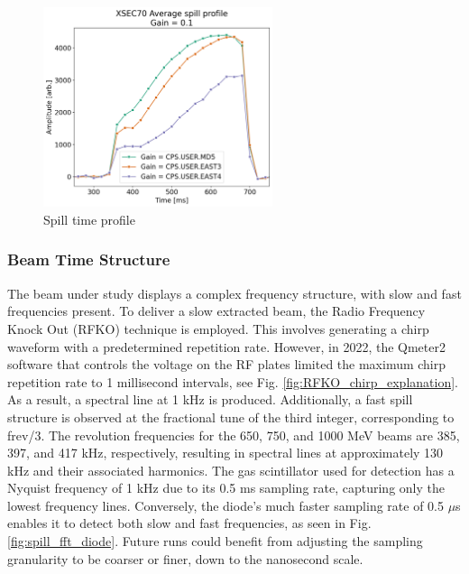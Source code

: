 \begin{figure}[!htb]
\centering
\includegraphics[width=0.6\textwidth]{images/spill_profile_xsec70_average_gain_0.1.png}
\caption{Spill time profile}
\label{fig:spill_time_profile4}
\end{figure}

\subsubsection{Beam Time Structure}
\label{beam_time_structure}

The beam under study displays a complex frequency structure, with slow and fast frequencies present. To deliver a slow extracted beam, the Radio Frequency Knock Out (RFKO) technique is employed. This involves generating a chirp waveform with a predetermined repetition rate. However, in 2022, the Qmeter2 software that controls the voltage on the RF plates limited the maximum chirp repetition rate to 1 millisecond intervals, see Fig. \ref{fig:RFKO_chirp_explanation}. As a result, a spectral line at 1 kHz is produced. Additionally, a fast spill structure is observed at the fractional tune of the third integer, corresponding to frev/3. The revolution frequencies for the 650, 750, and 1000 MeV beams are 385, 397, and 417 kHz, respectively, resulting in spectral lines at approximately 130 kHz and their associated harmonics. The gas scintillator used for detection has a Nyquist frequency of 1 kHz due to its 0.5 ms sampling rate, capturing only the lowest frequency lines. Conversely, the diode's much faster sampling rate of 0.5 $\mu$s enables it to detect both slow and fast frequencies, as seen in Fig. \ref{fig:spill_fft_diode}. Future runs could benefit from adjusting the sampling granularity to be coarser or finer, down to the nanosecond scale.


